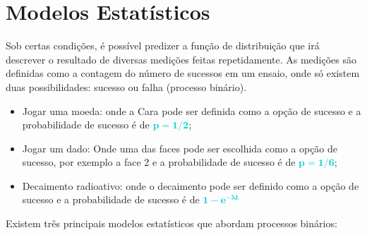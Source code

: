 \documentclass[11pt,a4paper]{article}
\newcounter{exemplo}
\begin{document}
\section{Modelos Estatísticos}

	Sob certas condições, é possível predizer a função de distribuição que irá descrever o resultado de diversas medições feitas repetidamente. As medições são definidas como a contagem do número de sucessos em um ensaio, onde só existem duas possibilidades: sucesso ou falha (processo binário).
	
	
	\begin{exemplo}

		\begin{itemize}
			\item Jogar uma moeda: onde a Cara pode ser definida como a opção de sucesso e a probabilidade de sucesso é de \textcolor{DarkTurquoise}{$\mathbf{p = 1/2}$};
			\item Jogar um dado: Onde uma das faces pode ser escolhida como a opção de sucesso, por exemplo a face 2 e a probabilidade de sucesso é de \textcolor{DarkTurquoise}{$\mathbf{p = 1/6}$};
			\item Decaimento radioativo: onde o decaimento pode ser definido como a opção de sucesso e a probabilidade de sucesso é de \textcolor{DarkTurquoise}{$\mathbf{1 - e^{-\lambda t}}$}
		\end{itemize}
		
	\end{exemplo}


	Existem três principais modelos estatísticos que abordam processos binários:
\end{document}
